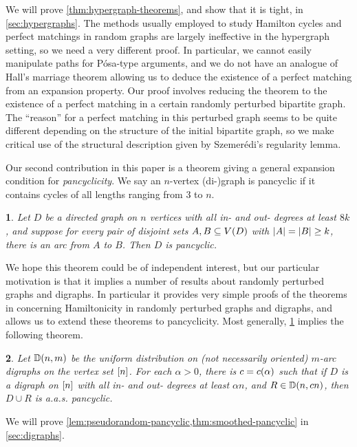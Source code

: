 \documentclass[11pt,english]{article}
\theoremstyle{plain}
\newtheorem{thm}{\protect\theoremname}
\theoremstyle{definition}
\theoremstyle{definition}
\theoremstyle{plain}
\theoremstyle{plain}
\theoremstyle{plain}
\theoremstyle{plain}
\theoremstyle{remark}
\theoremstyle{remark}
\let\originalleft\left
\let\originalright\right
\renewcommand{\left}{\mathopen{}\mathclose\bgroup\originalleft}
\renewcommand{\right}{\aftergroup\egroup\originalright}
\providecommand{\theoremname}{Theorem}
\begin{document}
We will prove \ref{thm:hypergraph-theorems}, and show that it is
tight, in \ref{sec:hypergraphs}. The methods usually employed to
study Hamilton cycles and perfect matchings in random graphs are largely
ineffective in the hypergraph setting, so we need a very different
proof. In particular, we cannot easily manipulate paths for P\'osa-type
arguments, and we do not have an analogue of Hall's marriage theorem
allowing us to deduce the existence of a perfect matching from an
expansion property. Our proof involves reducing the theorem to the
existence of a perfect matching in a certain randomly perturbed bipartite
graph. The ``reason'' for a perfect matching in this perturbed graph
seems to be quite different depending on the structure of the initial
bipartite graph, so we make critical use of the structural description
given by Szemer\'edi's regularity lemma.

Our second contribution in this paper is a theorem giving a general
expansion condition for\emph{ pancyclicity}. We say an $n$-vertex
\mbox{(di-)}graph is pancyclic if it contains cycles of all lengths
ranging from 3 to $n$.
\begin{thm}
\label{lem:pseudorandom-pancyclic}Let $D$ be a directed graph on
$n$ vertices with all in- and out- degrees at least $8k$, and suppose
for every pair of disjoint sets $A,B\subseteq V\left(D\right)$ with $\left|A\right|=\left|B\right|\ge k$,
there is an arc from $A$ to $B$. Then $D$ is pancyclic.
\end{thm}
We hope this theorem could be of independent interest, but our particular
motivation is that it implies a number of results about randomly perturbed
graphs and digraphs. In particular it provides very simple proofs
of the theorems in \cite{BFM03} concerning Hamiltonicity in randomly
perturbed graphs and digraphs, and allows us to extend these theorems
to pancyclicity. Most generally, \ref{lem:pseudorandom-pancyclic} implies the following theorem.

\begin{thm}
\label{thm:smoothed-pancyclic}Let $\DD\left(n,m\right)$ be the uniform
distribution on (not necessarily oriented) $m$-arc digraphs on the vertex set $\range n$.
For each $\alpha>0$, there is $\cdi=\cdi\left(\alpha\right)$ such that
if $D$ is a digraph on $\range n$ with all in- and out- degrees at least $\alpha n$,
and $R\in\DD\left(n,\cdi n\right)$, then $D\cup R$
is a.a.s. pancyclic.
\end{thm}

We will prove \ref{lem:pseudorandom-pancyclic,thm:smoothed-pancyclic} in  \ref{sec:digraphs}.
\end{document}
